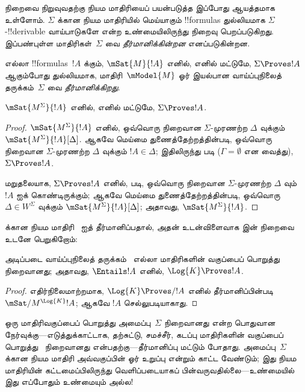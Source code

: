 \documentclass[../../../include/open-logic-section]{subfiles}
\begin{document}


நிறைவை நிறுவுவதற்கு நியம மாதிரியைப் பயன்படுத்த இப்போது ஆயத்தமாக உள்ளோம்.
$\Sigma$ க்கான நியம மாதிரியில் மெய்யாகும் !!{formula}s துல்லியமாக
$\Sigma$-!!{derivable} வாய்பாடுகளே என்ற உண்மையிலிருந்து நிறைவு பெறப்படுகிறது.
இப்பண்புள்ள மாதிரிகள்~$\Sigma$ வை \emph{தீர்மானிக்கின்றன} எனப்படுகின்றன.

\begin{defn}
  எல்லா !!{formula}s~$!A$ க்கும், $\mSat{M}{!A}$ எனில், எனில் மட்டுமே,
  $\Sigma \Proves !A$ ஆகும்போது துல்லியமாக, மாதிரி~$\mModel{M}$ ஓர்
  இயல்பான வாய்ப்புநிலைத் தருக்கம்~$\Sigma$ வை \emph{தீர்மானிக்கிறது}.
\end{defn}

\begin{thm}[தீர்மானிப்பு]
   $\mSat{M^\Sigma}{!A}$ எனில், எனில் மட்டுமே, $\Sigma \Proves !A$.
\end{thm}

\begin{proof}
  $\mSat{M^\Sigma}{!A}$ எனில், ஒவ்வொரு நிறைவான
  $\Sigma$-முரணற்ற $\Delta$ வுக்கும் $\mSat{M^\Sigma}{!A}[\Delta]$.
  ஆகவே மெய்மை துணைத்தேற்றத்தின்படி, ஒவ்வொரு நிறைவான
  $\Sigma$-முரணற்ற $\Delta$ வுக்கும் $!A \in \Delta$; இதிலிருந்து
   படி ($\Gamma =
  \emptyset$ என வைத்து), $\Sigma \Proves !A$.

  மறுதலையாக, $\Sigma \Proves !A$ எனில்,
   படி,
  ஒவ்வொரு நிறைவான $\Sigma$-முரணற்ற $\Delta$ வும்~$!A$ ஐக் கொண்டிருக்கும்;
  ஆகவே மெய்மை துணைத்தேற்றத்தின்படி, ஒவ்வொரு~$\Delta \in W^\Sigma$
  வுக்கும் $\mSat{M^\Sigma}{!A}[\Delta]$; அதாவது,
  $\mSat{M^\Sigma}{!A}$.
\end{proof}

 க்கான நியம மாதிரி~ ஐத் தீர்மானிப்பதால், அதன் உடன்விளைவாக
 இன் நிறைவை உடனே பெறுகிறோம்:

\begin{cor}
  அடிப்படை வாய்ப்புநிலைத் தருக்கம்~ எல்லா மாதிரிகளின் வகுப்பைப்
  பொறுத்து நிறைவானது; அதாவது, $\Entails !A$ எனில், $\Log{K}
  \Proves !A$.
\end{cor}

\begin{proof}
  எதிர்நிலைமாற்றமாக, $\Log{K} \Proves/ !A$ எனில் தீர்மானிப்பின்படி
  $\mSat/{M^{\Log{K}}}{!A}$; ஆகவே $!A$ செல்லுபடியாகாது.
\end{proof}

ஒரு மாதிரிவகுப்பைப் பொறுத்து அமைப்பு~$\Sigma$ நிறைவானது என்ற பொதுவான
நேர்வுக்கு---எடுத்துக்காட்டாக, தற்சுட்டு, சமச்சீர், கடப்பு மாதிரிகளின்
வகுப்பைப் பொறுத்து~ நிறைவானது என்பதற்கு---தீர்மானிப்பு மட்டும்
போதாது. அமைப்பு~$\Sigma$ க்கான நியம மாதிரி அவ்வகுப்பின் ஓர் உறுப்பு என்றும்
காட்ட வேண்டும்; இது நியம மாதிரியின் கட்டமைப்பிலிருந்து வெளிப்படையாகப்
பின்வருவதில்லை---உண்மையில் இது எப்போதும் உண்மையும் அல்ல!
\end{document}
